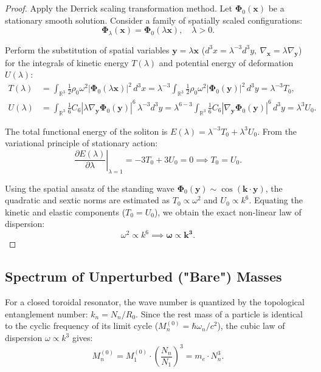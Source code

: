 \documentclass[12pt,a4paper]{article}
\begin{document}
	\begin{proof}
	Apply the Derrick scaling transformation method. Let $\boldsymbol{\Phi}_0(\mathbf{x})$ be a stationary smooth solution. Consider a family of spatially scaled configurations:
	\begin{equation}
	\boldsymbol{\Phi}_\lambda(\mathbf{x}) = \boldsymbol{\Phi}_0(\lambda \mathbf{x}), \quad \lambda > 0.
	\end{equation}
		
	Perform the substitution of spatial variables $\mathbf{y} = \lambda \mathbf{x}$ ($d^3x = \lambda^{-3} d^3y, \ \nabla_\mathbf{x} = \lambda \nabla_\mathbf{y}$) for the integrals of kinetic energy $T(\lambda)$ and potential energy of deformation $U(\lambda)$:
	\begin{align}
	T(\lambda) &= \int_{\mathbb{R}^3} \frac{1}{2} \rho_0 \omega^2 |\boldsymbol{\Phi}_0(\lambda \mathbf{x})|^2 \, d^3x = \lambda^{-3} \int_{\mathbb{R}^3} \frac{1}{2} \rho_0 \omega^2 |\boldsymbol{\Phi}_0(\mathbf{y})|^2 \, d^3y = \lambda^{-3} T_0, \\
	U(\lambda) &= \int_{\mathbb{R}^3} \frac{1}{6} C_6 |\lambda \nabla_\mathbf{y} \boldsymbol{\Phi}_0(\mathbf{y})|^6 \, \lambda^{-3} d^3y = \lambda^{6 - 3} \int_{\mathbb{R}^3} \frac{1}{6} C_6 |\nabla_\mathbf{y} \boldsymbol{\Phi}_0(\mathbf{y})|^6 \, d^3y = \lambda^3 U_0.
	\end{align}
		
	The total functional energy of the soliton is $E(\lambda) = \lambda^{-3} T_0 + \lambda^3 U_0$. 
	From the variational principle of stationary action:
	\begin{equation}
	\left. \frac{\partial E(\lambda)}{\partial \lambda} \right|_{\lambda=1} = -3 T_0 + 3 U_0 = 0 \implies T_0 = U_0.
	\end{equation}
		
	Using the spatial ansatz of the standing wave $\boldsymbol{\Phi}_0(\mathbf{y}) \sim \cos(\mathbf{k} \cdot \mathbf{y})$, the quadratic and sextic norms are estimated as $T_0 \propto \omega^2$ and $U_0 \propto k^6$. Equating the kinetic and elastic components ($T_0 = U_0$), we obtain the exact non-linear law of dispersion:
	\begin{equation}
	\omega^2 \propto k^6 \implies \mathbf{\omega \propto k^3}.
	\end{equation}
	\end{proof}
	
	\subsection{Spectrum of Unperturbed ("Bare") Masses}
	For a closed toroidal resonator, the wave number is quantized by the topological entanglement number: $k_n = N_n / R_0$. Since the rest mass of a particle is identical to the cyclic frequency of its limit cycle ($M_n^{(0)} = \hbar \omega_n / c^2$), the cubic law of dispersion $\omega \propto k^3$ gives:
	\begin{equation}
	M_n^{(0)} = M_1^{(0)} \cdot \left( \frac{N_n}{N_1} \right)^3 = m_e \cdot N_n^3.
	\end{equation}
	
\end{document}
